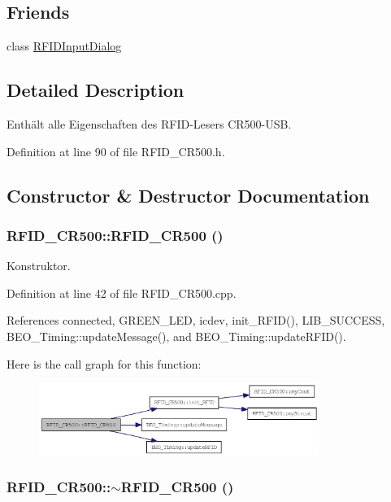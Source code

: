 \subsection*{Friends}
\begin{CompactItemize}
\item 
class \hyperlink{class_r_f_i_d___c_r500_3700c0c9e8357fc4d1f1014315681074}{RFIDInputDialog}
\end{CompactItemize}


\subsection{Detailed Description}
Enthält alle Eigenschaften des RFID-Lesers CR500-USB. 

Definition at line 90 of file RFID\_\-CR500.h.

\subsection{Constructor \& Destructor Documentation}
\hypertarget{class_r_f_i_d___c_r500_2d028be0db1277a8feca1cfbd4f5619e}{
\subsubsection[RFID\_\-CR500]{\setlength{\rightskip}{0pt plus 5cm}RFID\_\-CR500::RFID\_\-CR500 ()}}
\label{class_r_f_i_d___c_r500_2d028be0db1277a8feca1cfbd4f5619e}


Konstruktor. 



Definition at line 42 of file RFID\_\-CR500.cpp.

References connected, GREEN\_\-LED, icdev, init\_\-RFID(), LIB\_\-SUCCESS, BEO\_\-Timing::updateMessage(), and BEO\_\-Timing::updateRFID().

Here is the call graph for this function:\nopagebreak
\begin{figure}[H]
\begin{center}
\leavevmode
\includegraphics[width=258pt]{class_r_f_i_d___c_r500_2d028be0db1277a8feca1cfbd4f5619e_cgraph}
\end{center}
\end{figure}
\hypertarget{class_r_f_i_d___c_r500_766c86b545f284a11e285305e88cd97a}{
\subsubsection[$\sim$RFID\_\-CR500]{\setlength{\rightskip}{0pt plus 5cm}RFID\_\-CR500::$\sim$RFID\_\-CR500 ()}}
\label{class_r_f_i_d___c_r500_766c86b545f284a11e285305e88cd97a}


